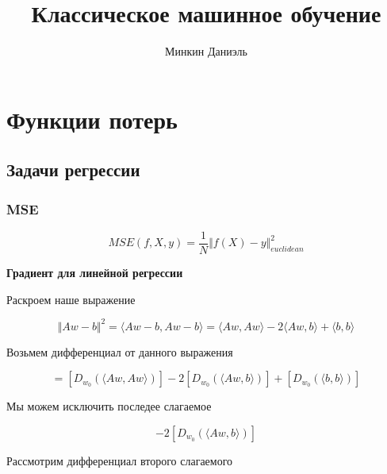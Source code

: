 \documentclass{article}
\title{Классическое машинное обучение}
\author{Минкин Даниэль}
\begin{document}
    \maketitle

    \tableofcontents %

    \section{Функции потерь}

    \subsection{Задачи регрессии}

    \subsubsection{MSE}

    \begin{equation}
        MSE(f, X, y) =  \frac{1}{N} \Vert f(X) -  y \Vert_{euclidean}^{2} 
    \end{equation}

    \quad 

    \textbf{Градиент для линейной регрессии}

    \quad 

    Раскроем наше выражение

    \begin{equation}
        \Vert Aw - b \Vert^{2} = \langle Aw - b, Aw - b \rangle = \langle Aw, Aw  \rangle - 2 \langle Aw, b  \rangle + \langle b, b  \rangle
    \end{equation}

    Возьмем дифференциал от данного выражения 

    \begin{equation}
        [D_{w_{0}} (\Vert Aw - b \Vert)] = [D_{w_{0}} (\langle Aw, Aw  \rangle)] - 2 [D_{w_{0}} (\langle Aw, b  \rangle)] + [D_{w_{0}} (\langle b, b  \rangle)]
    \end{equation}

    Мы можем исключить последее слагаемое

    \begin{equation}
        [D_{w_{0}} (\langle Aw, Aw  \rangle)] - 2 [D_{w_{0}} (\langle Aw, b  \rangle)] 
    \end{equation}

    Рассмотрим дифференциал второго слагаемого 
\end{document}
